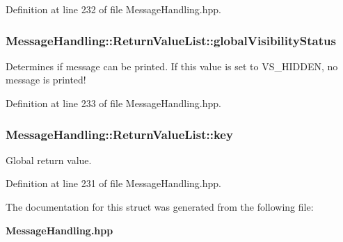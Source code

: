 Definition at line 232 of file MessageHandling.hpp.

\subsubsection[{globalVisibilityStatus}]{ {\bf MessageHandling::ReturnValueList::globalVisibilityStatus}}\label{structMessageHandling_1_1ReturnValueList_afb06de1c22ce41511753923ea8fa7542}
Determines if message can be printed. If this value is set to VS\_\-HIDDEN, no message is printed! 

Definition at line 233 of file MessageHandling.hpp.

\subsubsection[{key}]{ {\bf MessageHandling::ReturnValueList::key}}\label{structMessageHandling_1_1ReturnValueList_ad1a32761233ddf33b534717291c07cc0}
Global return value. 

Definition at line 231 of file MessageHandling.hpp.



The documentation for this struct was generated from the following file:\begin{DoxyCompactItemize}
\item 
{\bf MessageHandling.hpp}\end{DoxyCompactItemize}
